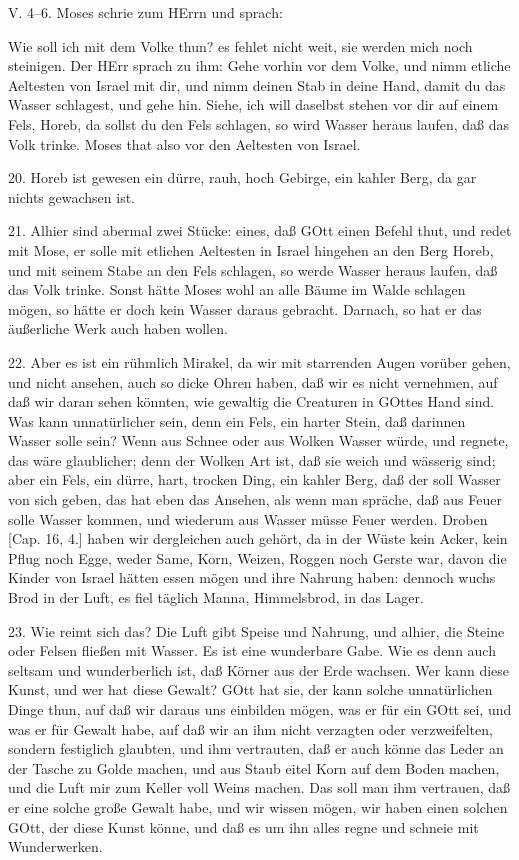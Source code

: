 \begin{schriftzitat}
V. 4–6. Moses schrie zum HErrn und sprach:
\end{schriftzitat}

Wie soll ich mit dem Volke thun? es fehlet nicht weit, sie werden mich noch steinigen. Der HErr sprach zu ihm: Gehe vorhin vor dem Volke, und nimm etliche Aeltesten von Israel mit dir, und nimm deinen Stab in deine Hand, damit du das Wasser schlagest, und gehe hin. Siehe, ich will daselbst stehen vor dir auf einem Fels, Horeb, da sollst du den Fels schlagen, so wird Wasser heraus laufen, daß das Volk trinke. Moses that also vor den Aeltesten von Israel.

20. Horeb ist gewesen ein dürre, rauh, hoch Gebirge, ein kahler Berg, da gar nichts gewachsen ist.

21. Alhier sind abermal zwei Stücke: eines, daß GOtt einen Befehl thut, und redet mit Mose, er solle mit etlichen Aeltesten in Israel hingehen an den Berg Horeb, und mit seinem Stabe an den Fels schlagen, so werde Wasser heraus laufen, daß das Volk trinke. Sonst hätte Moses wohl an alle Bäume im Walde schlagen mögen, so hätte er doch kein Wasser daraus gebracht. Darnach, so hat er das äußerliche Werk auch haben wollen.

22. Aber es ist ein rühmlich Mirakel, da wir mit starrenden Augen vorüber gehen, und nicht ansehen, auch so dicke Ohren haben, daß wir es nicht vernehmen, auf daß wir daran sehen könnten, wie gewaltig die Creaturen in GOttes Hand sind. Was kann unnatürlicher sein, denn ein Fels, ein harter Stein, daß darinnen Wasser solle sein? Wenn aus Schnee oder aus Wolken Wasser würde, und regnete, das wäre glaublicher; denn der Wolken Art ist, daß sie weich und wässerig sind; aber ein Fels, ein dürre, hart, trocken Ding, ein kahler Berg, daß der soll Wasser von sich geben, das hat eben das Ansehen, als wenn man spräche, daß aus Feuer solle Wasser kommen, und wiederum aus Wasser müsse Feuer werden. Droben [Cap. 16, 4.] haben wir dergleichen auch gehört, da in der Wüste kein Acker, kein Pflug noch Egge, weder Same, Korn, Weizen, Roggen noch Gerste war, davon die Kinder von Israel hätten essen mögen und ihre Nahrung haben: dennoch wuchs Brod in der Luft, es fiel täglich Manna, Himmelsbrod, in das Lager.

23. Wie reimt sich das? Die Luft gibt Speise und Nahrung, und alhier, die Steine oder Felsen fließen mit Wasser. Es ist eine wunderbare Gabe. Wie es denn auch seltsam und wunderberlich ist, daß Körner aus der Erde wachsen. Wer kann diese Kunst, und wer hat diese Gewalt? GOtt hat sie, der kann solche unnatürlichen Dinge thun, auf daß wir daraus uns einbilden mögen, was er für ein GOtt sei, und was er für Gewalt habe, auf daß wir an ihm nicht verzagten oder verzweifelten, sondern festiglich glaubten, und ihm vertrauten, daß er auch könne das Leder an der Tasche zu Golde machen, und aus Staub eitel Korn auf dem Boden machen, und die Luft mir zum Keller voll Weins machen. Das soll man ihm vertrauen, daß er eine solche große Gewalt habe, und wir wissen mögen, wir haben einen solchen GOtt, der diese Kunst könne, und daß es um ihn alles regne und schneie mit Wunderwerken.

